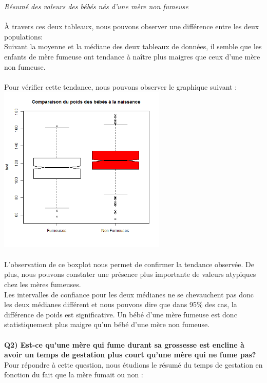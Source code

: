 \documentclass[a4paper, 9pt]{article}
\begin{document}
\textit{R\'esum\'e des valeurs des b\'eb\'es n\'es d'une m\`ere non fumeuse}\\ \\
\`A travers ces deux tableaux, nous pouvons observer une diff\'erence entre les deux populations:\\
Suivant la moyenne et la m\'ediane des deux tableaux de donn\'ees, il semble que les enfants de mère fumeuse
ont tendance \`a na\^itre plus maigres que ceux d'une m\`ere non fumeuse.\\ \\
\newpage
Pour v\'erifier cette tendance, nous pouvons observer le graphique suivant :\\
\includegraphics[height = 8cm, width = 8cm]{plots/boxplot_bwt_smoke.png}\\ \\
L'observation de ce boxplot nous permet de confirmer la tendance observ\'ee.
De plus, nous pouvons constater une pr\'esence plus importante de valeurs atypiques chez les m\`eres fumeuses.\\
Les intervalles de confiance pour les deux m\'edianes ne se chevauchent pas donc les deux m\'edianes diff\'erent et nous pouvons
dire que dans 95\% des cas, la différence de poids est significative.
Un b\'eb\'e d'une m\`ere fumeuse est donc statistiquement plus maigre qu'un b\'eb\'e d'une m\`ere non fumeuse.\\ \\
\newpage
\textbf{Q2) Est-ce qu’une mère qui fume durant sa grossesse est encline à avoir un temps de gestation plus
court qu’une mère qui ne fume pas?}\\
Pour répondre à cette question, nous étudions le résumé du temps de gestation en fonction du fait
que la m\`ere fumait ou non :\\ \\
\end{document}
